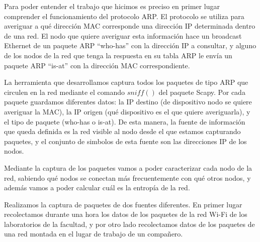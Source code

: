 Para poder entender el trabajo que hicimos es preciso en primer lugar comprender
el funcionamiento del protocolo ARP. El protocolo se utiliza para averiguar a
qué dirección MAC corresponde una dirección IP determinada dentro de una red. El
nodo que quiere averiguar esta información hace un broadcast Ethernet de un
paquete ARP ``who-has'' con la dirección IP a consultar, y alguno de los nodos
de la red que tenga la respuesta en su tabla ARP le envía un paquete ARP
``is-at'' con la dirección MAC correspondiente.

La herramienta que desarrollamos captura todos los paquetes de tipo ARP que
circulen en la red mediante el comando $sniff()$ del paquete Scapy. Por cada
paquete guardamos diferentes datos: la IP destino (de dispositivo nodo se quiere
averiguar la MAC), la IP origen (qué dispositivo es el que quiere averiguarla),
y el tipo de paquete (who-has o is-at). De esta manera, la fuente de información
que queda definida es la red visible al nodo desde el que estamos capturando
paquetes, y el conjunto de simbolos de esta fuente son las direcciones IP de los
nodos.

Mediante la captura de los paquetes vamos a poder caracterizar cada nodo de la
red, sabiendo qué nodos se conectan más frecuentemente con qué otros nodos, y
además vamos a poder calcular cuál es la entropía de la red.

Realizamos la captura de paquetes de dos fuentes diferentes. En primer lugar
recolectamos durante una hora los datos de los paquetes de la red Wi-Fi de los
laboratorios de la facultad, y por otro lado recolectamos datos de los paquetes
de una red montada en el lugar de trabajo de un compañero.